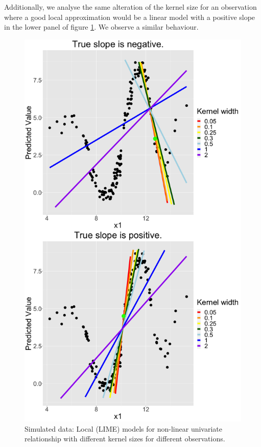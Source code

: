 \documentclass[]{krantz}
\begin{document}
Additionally, we analyse the same alteration of the kernel size for an
observation where a good local approximation would be a linear model
with a positive slope in the lower panel of figure \ref{fig:lime-fig6}.
We observe a similar behaviour.

\begin{figure}

{\centering \includegraphics[width=0.99\linewidth]{images/04-09-06} 

}

\caption{Simulated data: Local (LIME) models for non-linear univariate relationship with different kernel sizes for different observations.}\label{fig:lime-fig6}
\end{figure}
\end{document}
